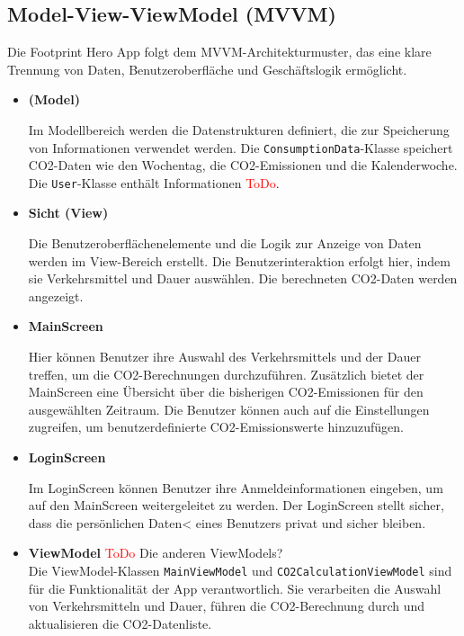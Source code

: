 \documentclass{article}
\begin{document}
\subsection{ Model-View-ViewModel (MVVM)}

Die Footprint Hero App folgt dem MVVM-Architekturmuster, das eine klare Trennung von Daten, Benutzeroberfläche und Geschäftslogik ermöglicht.
\begin{itemize}
\item \textbf{(Model)}

Im Modellbereich werden die Datenstrukturen definiert, die zur Speicherung von Informationen verwendet werden. Die \texttt{ConsumptionData}-Klasse speichert CO2-Daten wie den Wochentag, die CO2-Emissionen und die Kalenderwoche. Die \texttt{User}-Klasse enthält Informationen \textcolor{red}{ToDo}.

\item \textbf{Sicht (View)}

Die Benutzeroberflächenelemente und die Logik zur Anzeige von Daten werden im View-Bereich erstellt. Die Benutzerinteraktion erfolgt hier, indem sie Verkehrsmittel und Dauer auswählen. Die berechneten CO2-Daten werden angezeigt.

\item \textbf{MainScreen}

Hier können Benutzer ihre Auswahl des Verkehrsmittels und der Dauer treffen, um die CO2-Berechnungen durchzuführen. Zusätzlich bietet der MainScreen eine Übersicht über die bisherigen CO2-Emissionen für den ausgewählten Zeitraum. Die Benutzer können auch auf die Einstellungen zugreifen, um benutzerdefinierte CO2-Emissionswerte hinzuzufügen.


\item \textbf{LoginScreen}

Im LoginScreen können Benutzer ihre Anmeldeinformationen eingeben, um auf den MainScreen weitergeleitet zu werden. Der LoginScreen stellt sicher, dass die persönlichen Daten< eines Benutzers privat und sicher bleiben.


\item \textbf{ViewModel}
\textcolor{red}{ToDo} Die anderen ViewModels?\\
Die ViewModel-Klassen \texttt{MainViewModel} und \texttt{CO2CalculationViewModel} sind für die Funktionalität der App verantwortlich. Sie verarbeiten die Auswahl von Verkehrsmitteln und Dauer, führen die CO2-Berechnung durch und aktualisieren die CO2-Datenliste.
\end{itemize}
\end{document}
